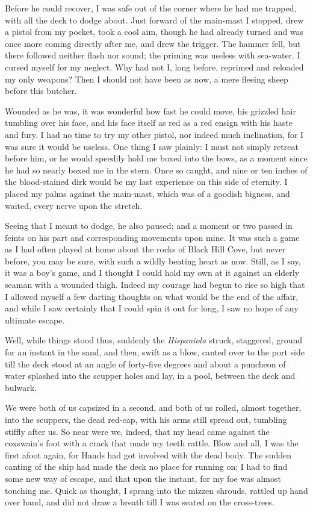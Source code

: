 Before he could recover, I was safe out of the corner where he had me trapped, with all the deck to dodge about. Just forward of the main-mast I stopped, drew a pistol from my pocket, took a cool aim, though he had already turned and was once more coming directly after me, and drew the trigger. The hammer fell, but there followed neither flash nor sound; the priming was useless with sea-water. I cursed myself for my neglect. Why had not I, long before, reprimed and reloaded my only weapons? Then I should not have been as now, a mere fleeing sheep before this butcher.

Wounded as he was, it was wonderful how fast he could move, his grizzled hair tumbling over his face, and his face itself as red as a red ensign with his haste and fury. I had no time to try my other pistol, nor indeed much inclination, for I was sure it would be useless. One thing I saw plainly: I must not simply retreat before him, or he would speedily hold me boxed into the bows, as a moment since he had so nearly boxed me in the stern. Once so caught, and nine or ten inches of the blood-stained dirk would be my last experience on this side of eternity. I placed my palms against the main-mast, which was of a goodish bigness, and waited, every nerve upon the stretch.

Seeing that I meant to dodge, he also paused; and a moment or two passed in feints on his part and corresponding movements upon mine. It was such a game as I had often played at home about the rocks of Black Hill Cove, but never before, you may be sure, with such a wildly beating heart as now. Still, as I say, it was a boy's game, and I thought I could hold my own at it against an elderly seaman with a wounded thigh. Indeed my courage had begun to rise so high that I allowed myself a few darting thoughts on what would be the end of the affair, and while I saw certainly that I could spin it out for long, I saw no hope of any ultimate escape.

Well, while things stood thus, suddenly the \textit{Hispaniola} struck, staggered, ground for an instant in the sand, and then, swift as a blow, canted over to the port side till the deck stood at an angle of forty-five degrees and about a puncheon of water splashed into the scupper holes and lay, in a pool, between the deck and bulwark.

We were both of us capsized in a second, and both of us rolled, almost together, into the scuppers, the dead red-cap, with his arms still spread out, tumbling stiffly after us. So near were we, indeed, that my head came against the coxswain's foot with a crack that made my teeth rattle. Blow and all, I was the first afoot again, for Hands had got involved with the dead body. The sudden canting of the ship had made the deck no place for running on; I had to find some new way of escape, and that upon the instant, for my foe was almost touching me. Quick as thought, I sprang into the mizzen shrouds, rattled up hand over hand, and did not draw a breath till I was seated on the cross-trees.

